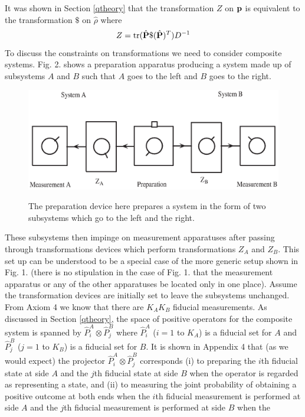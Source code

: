 \documentclass[10pt,twocolumn]{article}
\begin{document}
It was shown in Section \ref{qtheory}
that the transformation $Z$ on ${\bf p}$ is
equivalent to the transformation $\$ $ on $\hat{\rho}$ where
\begin{equation}\label{transZprho}
Z={\rm tr}(\hat{\bf P}\$(\hat{\bf P})^T) D^{-1}
\end{equation}
To discuss the constraints on transformations we need to
consider composite systems.
Fig. 2. shows a preparation apparatus producing a system made
up of subsystems $A$ and $B$ such that $A$ goes to the left and $B$ goes
to the right.
\begin{figure}[t]
{\includegraphics{qaxiomf2.eps}}
\caption{The preparation device here prepares a system in the form of
two subsystems which go to the left and the right.}
\end{figure}
These subsystems then impinge on measurement
apparatuses after passing through transformations devices which perform
transformations $Z_A$ and $Z_B$.  This set up
can be understood to be a special case of the more generic setup shown
in Fig. 1. (there is no stipulation in the case of Fig. 1. that the
measurement apparatus or any of the other apparatuses be located only
in one place).  Assume the
transformation devices are initially set to leave the subsystems
unchanged.  From Axiom 4 we know that there are $K_AK_B$ fiducial
measurements. As discussed in Section \ref{qtheory}, the space of
positive operators for the composite system is spanned by
$\hat{P}^A_i\otimes\hat{P}^B_j$ where $\hat{P}^A_i$ ($i=1$ to $K_A$) is
a fiducial set for $A$ and $\hat{P}^B_j$ ($j=1$ to $K_B$)
is a fiducial set for $B$. It is shown in Appendix 4 that (as we would
expect) the projector $\hat{P}^A_i\otimes\hat{P}^B_j$ corresponds
(i) to preparing the $i$th fiducial state at side $A$ and the $j$th
fiducial state at side $B$ when the operator is regarded as representing a
state, and
(ii) to measuring the joint probability of obtaining a positive outcome
at both ends when the $i$th fiducial measurement is performed at side
$A$ and the $j$th fiducial measurement is performed at side $B$ when the
\end{document}

